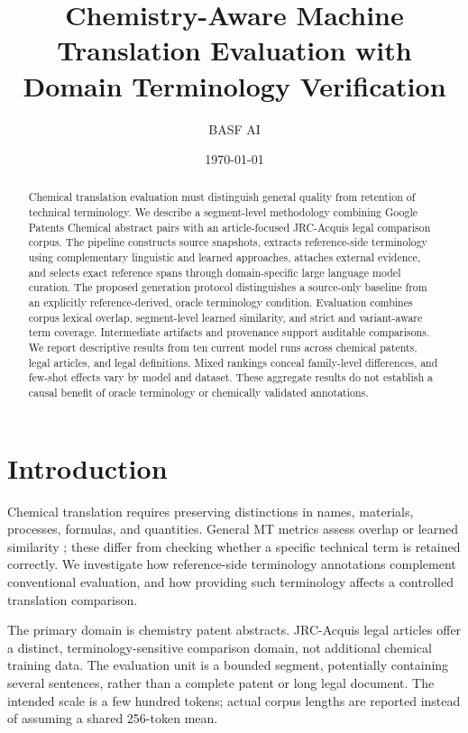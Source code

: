 \documentclass[11pt]{article}
\title{Chemistry-Aware Machine Translation Evaluation with Domain Terminology Verification}
\author{BASF AI}
\date{\today}
\begin{document}
\maketitle

\begin{abstract}
Chemical translation evaluation must distinguish general quality from retention of technical
terminology. We describe a segment-level methodology combining Google Patents Chemical abstract
pairs with an article-focused JRC-Acquis legal comparison corpus. The pipeline constructs source
snapshots, extracts reference-side terminology using complementary linguistic and learned approaches,
attaches external evidence, and selects exact reference spans through domain-specific large language
model curation. The proposed generation protocol distinguishes a source-only baseline from an
explicitly reference-derived, oracle terminology condition. Evaluation combines corpus lexical overlap,
segment-level learned similarity, and strict and variant-aware term coverage. Intermediate artifacts
and provenance support auditable comparisons. We report descriptive results from ten current model
runs across chemical patents, legal articles, and legal definitions. Mixed rankings conceal
family-level differences, and few-shot effects vary by model and dataset. These aggregate results
do not establish a causal benefit of oracle terminology or chemically validated annotations.
\end{abstract}

\section{Introduction}
\label{sec:introduction}

Chemical translation requires preserving distinctions in names, materials, processes, formulas,
and quantities. General MT metrics assess overlap or learned similarity
\cite{papineni2002,post2018,rei2020,zhang2020}; these differ from checking whether a specific technical
term is retained correctly. We investigate how reference-side terminology annotations complement
conventional evaluation, and how providing such terminology affects a controlled translation comparison.

The primary domain is chemistry patent abstracts. JRC-Acquis legal articles offer a distinct,
terminology-sensitive comparison domain, not additional chemical training data. The evaluation unit
is a bounded segment, potentially containing several sentences, rather than a complete patent or
long legal document. The intended scale is a few hundred tokens; actual corpus lengths are reported
instead of assuming a shared 256-token mean.
\end{document}
